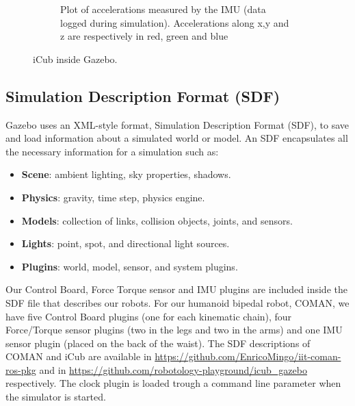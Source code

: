 \begin{figure}
\begin{subfigure}[b]{0.475\textwidth}
                \caption{Plot of accelerations measured by the IMU (data logged during simulation). Accelerations along x,y and z are respectively in red, green and blue}
                \label{yarp_simulation_icub_c}
        \end{subfigure}
        \caption{iCub inside Gazebo.}\label{icub_inertial}
\end{figure}

\subsection{Simulation Description Format (SDF)}
Gazebo uses an XML-style format, Simulation Description Format (SDF), to save and load information about a simulated world or model. An SDF encapsulates all the necessary information for a simulation such as:
\begin{itemize}
\item \textbf{Scene}: ambient lighting, sky properties, shadows.
\item \textbf{Physics}: gravity, time step, physics engine.
\item \textbf{Models}: collection of links, collision objects, joints, and sensors.
\item \textbf{Lights}: point, spot, and directional light sources.
\item \textbf{Plugins}: world, model, sensor, and system plugins.
\end{itemize}
Our Control Board, Force Torque sensor and IMU plugins are included inside the SDF file that describes our robots. For our humanoid bipedal robot, COMAN, we have five Control Board plugins (one for each kinematic chain), four Force/Torque sensor plugins (two in the legs and two in the arms) and one IMU sensor plugin (placed on the back of the waist). The SDF descriptions of COMAN and iCub are available in \url{https://github.com/EnricoMingo/iit-coman-ros-pkg} and in \url{https://github.com/robotology-playground/icub_gazebo} respectively.
The clock plugin is loaded trough a command line parameter when the simulator is started.




